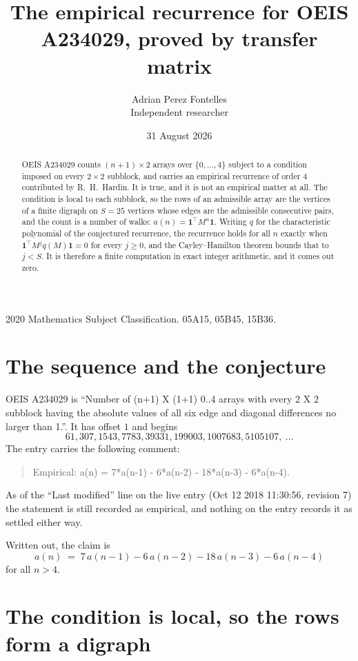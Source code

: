 \documentclass[11pt,a4paper]{article}
\title{The empirical recurrence for OEIS A234029, proved by transfer matrix}
\author{Adrian Perez Fontelles\\ \small Independent researcher}
\date{31 August 2026}
\theoremstyle{plain}
\theoremstyle{definition}
\begin{document}
\maketitle

\begin{abstract}
OEIS A234029 counts $(n+1)\times2$ arrays over $\{0,\dots,4\}$ subject to a condition imposed on
every $2\times2$ subblock, and carries an empirical recurrence of order $4$ contributed
by R.~H.~Hardin. It is true, and it is not an empirical matter at all. The condition is local
to each subblock, so the rows of an admissible array are the vertices of a finite digraph
on $S=25$ vertices whose edges are the admissible consecutive pairs, and the count is a
number of walks: $a(n)=\mathbf{1}^{\!\top}M^{n}\mathbf{1}$. Writing $q$
for the characteristic polynomial of the conjectured recurrence, the recurrence holds for all
$n$ exactly when $\mathbf{1}^{\!\top}M^{j}q(M)\mathbf{1}=0$ for every $j\ge0$, and the
Cayley--Hamilton theorem bounds that to $j<S$. It is therefore a finite computation in exact
integer arithmetic, and it comes out zero.
\end{abstract}

\noindent\small 2020 Mathematics Subject Classification. 05A15, 05B45, 15B36.\normalsize

\section{The sequence and the conjecture}

OEIS A234029 is ``Number of (n+1) X (1+1) 0..4 arrays with every 2 X 2 subblock having the absolute values of all six edge and diagonal differences no larger than 1.''. It has offset $1$ and begins
\[
61, 307, 1543, 7783, 39331, 199003, 1007683, 5105107,\ \dots
\]
The entry carries the following comment:
\begin{quote}\small
Empirical: a(n) = 7*a(n-1) - 6*a(n-2) - 18*a(n-3) - 6*a(n-4).
\end{quote}
As of the ``Last modified'' line on the live entry (Oct 12 2018 11:30:56, revision 7) the statement is
still recorded as empirical, and nothing on the entry records it as settled either way.

Written out, the claim is
\begin{equation}\label{eq:conj}
a(n)\;=\;7\,a(n-1) - 6\,a(n-2) - 18\,a(n-3) - 6\,a(n-4)
\end{equation}
for all $n>4$.

\section{The condition is local, so the rows form a digraph}
\end{document}
